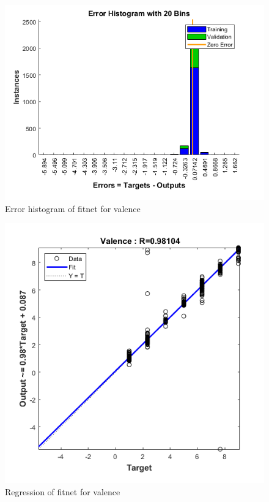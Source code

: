 \documentclass[a4paper]{report}
\begin{document}
		\begin{figure}[htbp]
		\centering
		\includegraphics[scale=0.9]{img/errorhist_fitnet_valence.png}
		\caption{Error histogram of fitnet for valence}
		\label{img: errorhist_fitnet_valence}
	\end{figure}
	
		\begin{figure}[htbp]
		\centering
		\includegraphics[scale=0.9]{img/regression_fitnet_valence.png}
		\caption{Regression of fitnet for valence}
		\label{img: regression_fitnet_valence}
	\end{figure}
	
\end{document}
